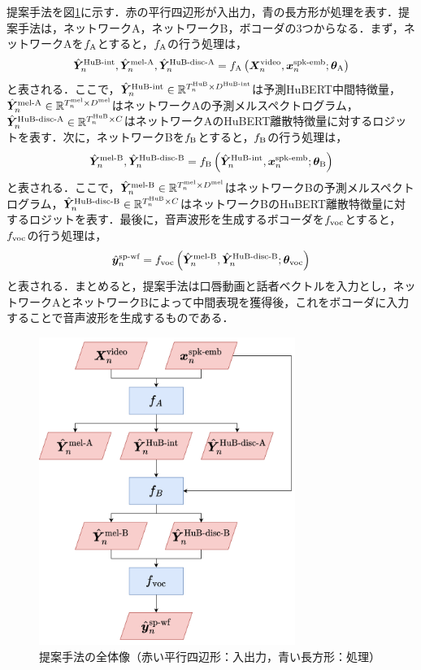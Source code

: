 提案手法を図\ref{sec4:fig:overview}に示す．赤の平行四辺形が入出力，青の長方形が処理を表す．提案手法は，ネットワークA，ネットワークB，ボコーダの3つからなる．まず，ネットワークAを$f_{\text{A}}$とすると，$f_{\text{A}}$の行う処理は，
\begin{equation}
    \label{sec4:eq:networkA_overview}
    \hat{\bm{Y}}^{\text{HuB-int}}_{n}, \hat{\bm{Y}}^{\text{mel-A}}_{n}, \hat{\bm{Y}}^{\text{HuB-disc-A}}_{n} = f_{\text{A}}\left(\bm{X}^{\text{video}}_{n}, \bm{x}^{\text{spk-emb}}_{n}; \bm{\theta}_{\text{A}}\right)
\end{equation}
と表される．ここで，$\hat{\bm{Y}}^{\text{HuB-int}}_{n} \in \mathbb{R}^{T^{\text{HuB}}_{n} \times D^{\text{HuB-int}}}$は予測HuBERT中間特徴量，$\hat{\bm{Y}}^{\text{mel-A}}_{n} \in \mathbb{R}^{T^{\text{mel}}_{n} \times D^{\text{mel}}}$はネットワークAの予測メルスペクトログラム，$\hat{\bm{Y}}^{\text{HuB-disc-A}}_{n} \in \mathbb{R}^{T^{\text{HuB}}_{n} \times C}$はネットワークAのHuBERT離散特徴量に対するロジットを表す．次に，ネットワークBを$f_{\text{B}}$とすると，$f_{\text{B}}$の行う処理は，
\begin{equation}
    \hat{\bm{Y}}^{\text{mel-B}}_{n}, \hat{\bm{Y}}^{\text{HuB-disc-B}}_{n} = f_{\text{B}}\left(\hat{\bm{Y}}^{\text{HuB-int}}_{n}, \bm{x}^{\text{spk-emb}}_{n}; \bm{\theta}_{\text{B}}\right)
\end{equation}
と表される．ここで，$\hat{\bm{Y}}^{\text{mel-B}}_{n} \in \mathbb{R}^{T^{\text{mel}}_{n} \times D^{\text{mel}}}$はネットワークBの予測メルスペクトログラム，$\hat{\bm{Y}}^{\text{HuB-disc-B}}_{n} \in \mathbb{R}^{T^{\text{HuB}}_{n} \times C}$はネットワークBのHuBERT離散特徴量に対するロジットを表す．最後に，音声波形を生成するボコーダを$f_{\text{voc}}$とすると，$f_{\text{voc}}$の行う処理は，
\begin{equation}
    \hat{\bm{y}}^{\text{sp-wf}}_{n} = f_{\text{voc}}\left(\hat{\bm{Y}}^{\text{mel-B}}_{n}, \hat{\bm{Y}}^{\text{HuB-disc-B}}_{n}; \bm{\theta}_{\text{voc}}\right)
\end{equation}
と表される．まとめると，提案手法は口唇動画と話者ベクトルを入力とし，ネットワークAとネットワークBによって中間表現を獲得後，これをボコーダに入力することで音声波形を生成するものである．

\begin{figure}[bt]
    \centering
    \includegraphics[height=100mm]{./figure/sec4/model_2/overview.drawio.png}
    \caption{提案手法の全体像（赤い平行四辺形：入出力，青い長方形：処理）}
    \label{sec4:fig:overview}
\end{figure}

